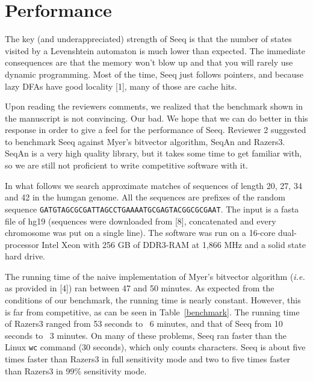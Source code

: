 \documentclass[12pt]{article}
\begin{document}
\section{Performance}

The key (and underappreciated) strength of Seeq is that the number
of states visited by a Levenshtein automaton is much lower than
expected. The immediate consequences are that the memory won't blow
up and that you will rarely use dynamic programming. Most of the
time, Seeq just follows pointers, and because lazy DFAs have good
locality [1], many of those are cache hits.

Upon reading the reviewers comments, we realized that the benchmark
shown in the manuscript is not convincing. Our bad. We hope that
we can do better in this response in order to give a feel for the
performance of Seeq. Reviewer 2 suggested to benchmark Seeq against
Myer's bitvector algorithm, SeqAn and Razers3. SeqAn is a very high
quality library, but it takes some time to get familiar with, so we
are still not proficient to write competitive software with it.

In what follows we search approximate matches of sequences of length 20,
27, 34 and 42 in the humgan genome. All the sequences are prefixes of
the random sequence \texttt{GATGTAGCGCGATTAGCCTGAAAATGCGAGTACGGCGCGAAT}.
The input is a fasta file of hg19 (sequences were downloaded from [8],
concatenated and every chromosome was put on a single line). The
software was run on a 16-core dual-processor Intel Xeon with 256 GB
of DDR3-RAM at 1,866 MHz and a solid state hard drive.

The running time of the naive implementation of Myer's bitvector
algorithm (\textit{i.e.} as provided in [4]) ran between 47 and 50
minutes. As expected from the conditions of our benchmark, the running
time is nearly constant. However, this is far from competitive, as
can be seen in Table~\ref{benchmark}. The running time of Razers3
ranged from 53 seconds to ~6 minutes, and that of Seeq from 10 seconds
to ~3 minutes. On many of these problems, Seeq ran faster than
the Linux \texttt{wc} command (30 seconds), which only counts
characters. Seeq is about five times faster than Razers3 in full
sensitivity mode and two to five times faster than Razers3 in 99\%
sensitivity mode.
\end{document}

